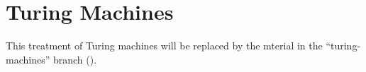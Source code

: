 \documentclass[../../include/open-logic-part]{subfiles}
\begin{document}
\part{Turing Machines}

\begin{editorial}
This treatment of Turing machines will be replaced by the mterial in
the ``turing-machines'' branch ().
  \end{editorial}



\OLEndPartHook
\end{document}
